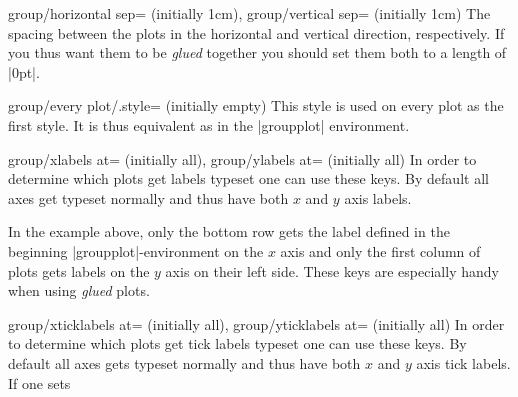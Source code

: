 {\begin{pgfplotskeylist}{group/horizontal sep= (initially 1cm),
      group/vertical sep= (initially 1cm)}
  The spacing between the plots in the horizontal and vertical direction, respectively. If you thus want them to be \textit{glued} together you should set
  them both to a length of |0pt|.
\end{pgfplotskeylist}

\begin{pgfplotskey}{group/every plot/.style= (initially empty)}
      This style is used on every plot as the first style. It is thus equivalent as  in the |groupplot| environment.
\end{pgfplotskey}

\begin{pgfplotskeylist}{%
	group/xlabels at= (initially all),%
	group/ylabels at= (initially all)}
  In order to determine which plots get labels typeset one can use these keys. By default all axes get typeset normally and thus have both $x$ and
  $y$ axis labels.
\begin{codeexample}[]
\end{codeexample}
In the example above, only the bottom row gets the label defined in the beginning |groupplot|-environment on the $x$ axis and only the first column of plots gets labels on the
$y$ axis on their left side. These keys are especially handy when using \textit{glued} plots.
\end{pgfplotskeylist}

\begin{pgfplotskeylist}{%
	group/xticklabels at= (initially all),%
	group/yticklabels at= (initially all)}
  In order to determine which plots get tick labels typeset one can use these keys. By default all axes gets typeset normally and thus have both $x$ and
  $y$ axis tick labels. If one sets


\end{pgfplotskeylist}}
